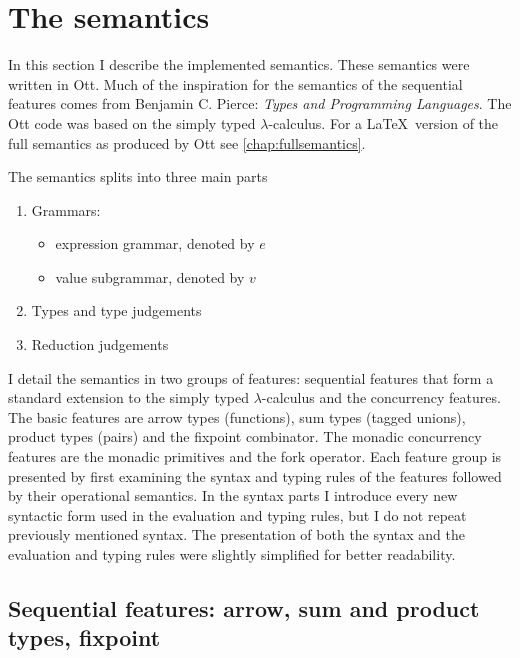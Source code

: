 \documentclass[12pt,twoside,notitlepage]{report}
\theoremstyle{plain}%
\theoremstyle{definition}
\theoremstyle{remark}
\begin{document}
\section{The semantics}\label{sec:the-semanticssec:the-semantics}
In this section I describe the implemented semantics. These semantics were written in Ott.  Much of the inspiration for the semantics of the sequential features comes from Benjamin C. Pierce: \textit{Types and Programming Languages}\cite{pierce2002types}. The Ott code was based on the simply typed $ \lambda $-calculus\cite{church1940formulation}. For a \LaTeX\, version of the full semantics as produced by Ott see \cref{chap:fullsemantics}.

 
The semantics splits into three main parts
\begin{enumerate}
\item{Grammars:\begin{itemize}
\item{expression grammar, denoted by $ e $}
\item{value subgrammar, denoted by $ v $}
\end{itemize}}
\item{Types and type judgements}
\item{Reduction judgements}
\end{enumerate}

I detail the semantics in two groups of features: sequential features that form a standard extension to the simply typed $ \lambda $-calculus and the concurrency features. The basic features are arrow types (functions), sum types (tagged unions), product types (pairs) and the fixpoint combinator. The monadic concurrency features are the monadic primitives and the fork operator. Each feature group is presented by first examining the syntax and typing rules of the features followed by their operational semantics. In the syntax parts I introduce every new syntactic form used in the evaluation and typing rules, but I do not repeat previously mentioned syntax. The presentation of both the syntax and the evaluation and typing rules were slightly simplified for better readability.   
\subsection{Sequential features: arrow, sum and product types, fixpoint}
\end{document}
